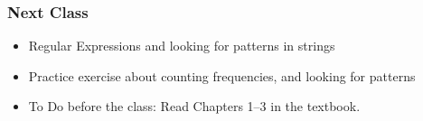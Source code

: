 \documentclass{beamer}
\begin{document}
\begin{frame}
\frametitle{Next Class}
\begin{itemize}
\item Regular Expressions and looking for patterns in strings
\item Practice exercise about counting frequencies, and looking for patterns
\item To Do before the class: Read Chapters 1--3 in the textbook. 
\end{itemize}
\end{frame}
\end{document}
